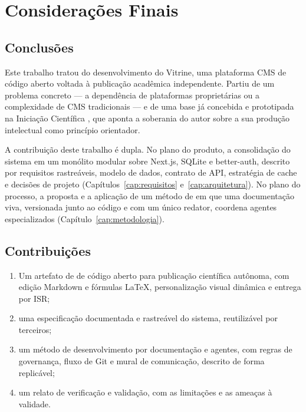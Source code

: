 \chapter{Considerações Finais}\label{cap:conclusao}

\section{Conclusões}\label{sec:conclusoes}

Este trabalho tratou do desenvolvimento do Vitrine, uma plataforma CMS de código aberto voltada à publicação acadêmica independente. Partiu de um problema concreto --- a dependência de plataformas proprietárias ou a complexidade de CMS tradicionais --- e de uma base já concebida e prototipada na Iniciação Científica \cite{reis2026ic}, que aponta a soberania do autor sobre a sua produção intelectual como princípio orientador.

A contribuição deste trabalho é dupla. No plano do produto, a consolidação do sistema em um monólito modular sobre Next.js, SQLite e better-auth, descrito por requisitos rastreáveis, modelo de dados, contrato de API, estratégia de cache e decisões de projeto (Capítulos~\ref{cap:requisitos} e~\ref{cap:arquitetura}). No plano do processo, a proposta e a aplicação de um método de  em que uma documentação viva, versionada junto ao código e com um único redator, coordena agentes especializados (Capítulo~\ref{cap:metodologia}).


\section{Contribuições}\label{sec:contribuicoes-finais}

\begin{enumerate}
  \item Um artefato de  de código aberto para publicação científica autônoma, com edição Markdown e fórmulas \LaTeX{}, personalização visual dinâmica e entrega por ISR;
  \item uma especificação documentada e rastreável do sistema, reutilizável por terceiros;
  \item um método de desenvolvimento por documentação e agentes, com regras de governança, fluxo de Git e mural de comunicação, descrito de forma replicável;
  \item um relato de verificação e validação, com as limitações e as ameaças à validade.
\end{enumerate}

